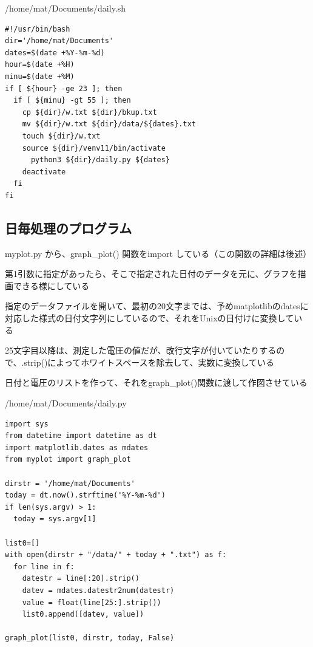 \documentclass[12pt,a4paper,uplatex]{jsarticle}
\begin{document}
\begin{itembox}[l]{/home/mat/Documents/daily.sh}
	\begin{verbatim}
#!/usr/bin/bash
dir='/home/mat/Documents'
dates=$(date +%Y-%m-%d)
hour=$(date +%H)
minu=$(date +%M)
if [ ${hour} -ge 23 ]; then
  if [ ${minu} -gt 55 ]; then
    cp ${dir}/w.txt ${dir}/bkup.txt
    mv ${dir}/w.txt ${dir}/data/${dates}.txt
    touch ${dir}/w.txt
    source ${dir}/venv11/bin/activate
      python3 ${dir}/daily.py ${dates}
    deactivate
  fi
fi
	\end{verbatim}
\end{itembox}


\subsection{日毎処理のプログラム}

	myplot.py から、graph\_plot() 関数をimport している（この関数の詳細は後述）
	
	第1引数に指定があったら、そこで指定された日付のデータを元に、グラフを描画できる様にしている
	
	指定のデータファイルを開いて、最初の20文字までは、予めmatplotlibのdatesに対応した様式の日付文字列にしているので、それをUnixの日付けに変換している
	
	25文字目以降は、測定した電圧の値だが、改行文字が付いていたりするので、.strip()によってホワイトスペースを除去して、実数に変換している
	
	日付と電圧のリストを作って、それをgraph\_plot()関数に渡して作図させている

\begin{itembox}[l]{/home/mat/Documents/daily.py}
	\begin{verbatim}
import sys
from datetime import datetime as dt
import matplotlib.dates as mdates
from myplot import graph_plot

dirstr = '/home/mat/Documents'
today = dt.now().strftime('%Y-%m-%d')
if len(sys.argv) > 1:
  today = sys.argv[1]

list0=[]
with open(dirstr + "/data/" + today + ".txt") as f:
  for line in f:
    datestr = line[:20].strip()
    datev = mdates.datestr2num(datestr)
    value = float(line[25:].strip())
    list0.append([datev, value])

graph_plot(list0, dirstr, today, False)
	\end{verbatim}
\end{itembox}
\end{document}
